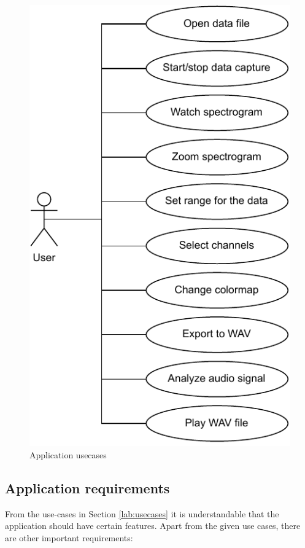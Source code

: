 \begin{figure}[h]
    \centering
    \includegraphics{pdf/usecase.drawio.pdf}
    \caption{Application usecases}
    \label{fig:usecase}
\end{figure}

\subsection{Application requirements}\label{txt.design.sw.requirements}

From the use-cases in Section \ref{lab:usecases} it is understandable that the application should have certain features. Apart from the given use cases, there are other important requirements:

